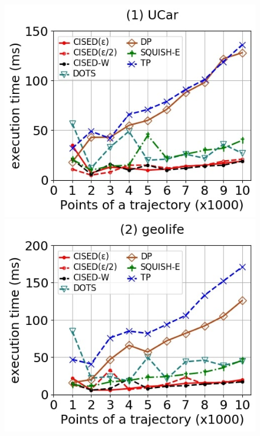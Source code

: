 {\begin{figure}[tb!]
	\centering
	\includegraphics[scale=0.250]{Figures/Exp-SED-time-size-service.jpg}	\hspace{0.5ex}
	\includegraphics[scale=0.250]{Figures/Exp-SED-time-size-geolife.jpg}	\hspace{0.5ex}

\end{figure}}
